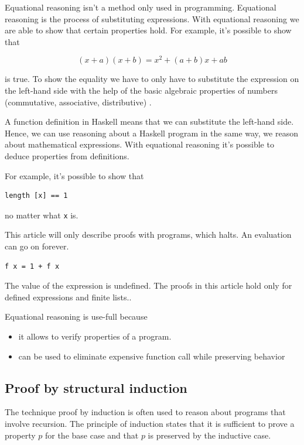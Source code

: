 \documentclass[twoside, a4paper]{article}
\begin{document}
Equational reasoning isn't a method only used in programming. Equational reasoning is the process of substituting expressions. With equational reasoning we are able to show that certain properties hold.
For example, it's possible to show that

\begin{equation}
  \label{eq:sum}
  (x+a)(x+b) = x^2 + (a+b)x+ab
\end{equation}

is true. To show the equality we have to only have to substitute the expression on the left-hand side with the help of the basic algebraic properties of numbers (commutative, associative, distributive) \cite{hutton}.

A function definition in Haskell means that we can substitute the left-hand side. Hence, we can use reasoning about a Haskell program in the same way, we reason about mathematical expressions. With equational reasoning it's possible to deduce properties from definitions.

For example, it's possible to show that 
\begin{verbatim}
length [x] == 1
\end{verbatim}
no matter what \verb|x| is.

This article will only describe proofs with programs, which halts. An evaluation can go on forever.
\begin{verbatim}
f x = 1 + f x
\end{verbatim}

The value of the expression is undefined. The proofs in this article hold only for defined expressions and finite lists..

Equational reasoning is use-full because
\begin{itemize}
\item it allows to verify properties of a program.
\item can be used to eliminate expensive function call while preserving behavior
\end{itemize}

\subsection{Proof by structural induction}
\label{sec:induction}

The technique proof by induction is often used to reason about programs that involve recursion. The principle of induction states that it is sufficient to prove a property $p$ for the base case and that $p$ is preserved by the inductive case.
\end{document}
